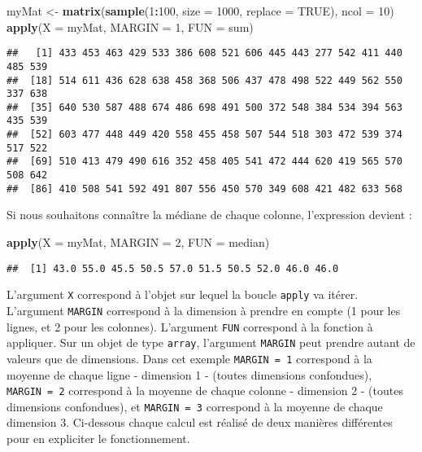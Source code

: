 \documentclass[]{book}
\newenvironment{Shaded}{\begin{snugshade}}{\end{snugshade}}
\newcommand{\KeywordTok}[1]{\textcolor[rgb]{0.13,0.29,0.53}{\textbf{#1}}}
\newcommand{\DataTypeTok}[1]{\textcolor[rgb]{0.13,0.29,0.53}{#1}}
\newcommand{\DecValTok}[1]{\textcolor[rgb]{0.00,0.00,0.81}{#1}}
\newcommand{\StringTok}[1]{\textcolor[rgb]{0.31,0.60,0.02}{#1}}
\newcommand{\OtherTok}[1]{\textcolor[rgb]{0.56,0.35,0.01}{#1}}
\newcommand{\OperatorTok}[1]{\textcolor[rgb]{0.81,0.36,0.00}{\textbf{#1}}}
\newcommand{\NormalTok}[1]{#1}
\theoremstyle{definition}
\theoremstyle{definition}
\theoremstyle{definition}
\theoremstyle{remark}
\begin{document}
\begin{Shaded}
\begin{Highlighting}[]
\NormalTok{myMat <-}\StringTok{ }\KeywordTok{matrix}\NormalTok{(}\KeywordTok{sample}\NormalTok{(}\DecValTok{1}\OperatorTok{:}\DecValTok{100}\NormalTok{, }\DataTypeTok{size =} \DecValTok{1000}\NormalTok{, }\DataTypeTok{replace =} \OtherTok{TRUE}\NormalTok{), }\DataTypeTok{ncol =} \DecValTok{10}\NormalTok{)}
\KeywordTok{apply}\NormalTok{(}\DataTypeTok{X =}\NormalTok{ myMat, }\DataTypeTok{MARGIN =} \DecValTok{1}\NormalTok{, }\DataTypeTok{FUN =}\NormalTok{ sum)}
\end{Highlighting}
\end{Shaded}

\begin{verbatim}
##   [1] 433 453 463 429 533 386 608 521 606 445 443 277 542 411 440 485 539
##  [18] 514 611 436 628 638 458 368 506 437 478 498 522 449 562 550 337 638
##  [35] 640 530 587 488 674 486 698 491 500 372 548 384 534 394 563 435 539
##  [52] 603 477 448 449 420 558 455 458 507 544 518 303 472 539 374 517 522
##  [69] 510 413 479 490 616 352 458 405 541 472 444 620 419 565 570 508 642
##  [86] 410 508 541 592 491 807 556 450 570 349 608 421 482 633 568
\end{verbatim}

Si nous souhaitons connaître la médiane de chaque colonne, l'expression
devient :

\begin{Shaded}
\begin{Highlighting}[]
\KeywordTok{apply}\NormalTok{(}\DataTypeTok{X =}\NormalTok{ myMat, }\DataTypeTok{MARGIN =} \DecValTok{2}\NormalTok{, }\DataTypeTok{FUN =}\NormalTok{ median)}
\end{Highlighting}
\end{Shaded}

\begin{verbatim}
##  [1] 43.0 55.0 45.5 50.5 57.0 51.5 50.5 52.0 46.0 46.0
\end{verbatim}

L'argument \texttt{X} correspond à l'objet sur lequel la boucle
\texttt{apply} va itérer. L'argument \texttt{MARGIN} correspond à la
dimension à prendre en compte (1 pour les lignes, et 2 pour les
colonnes). L'argument \texttt{FUN} correspond à la fonction à appliquer.
Sur un objet de type \texttt{array}, l'argument \texttt{MARGIN} peut
prendre autant de valeurs que de dimensions. Dans cet exemple
\texttt{MARGIN\ =\ 1} correspond à la moyenne de chaque ligne -
dimension 1 - (toutes dimensions confondues), \texttt{MARGIN\ =\ 2}
correspond à la moyenne de chaque colonne - dimension 2 - (toutes
dimensions confondues), et \texttt{MARGIN\ =\ 3} correspond à la moyenne
de chaque dimension 3. Ci-dessous chaque calcul est réalisé de deux
manières différentes pour en expliciter le fonctionnement.
\end{document}
